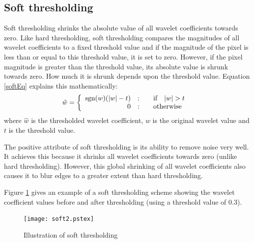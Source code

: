 \documentclass[12pt]{report}
\begin{document}
\subsection{Soft thresholding}
\label{subsec:softTh}
Soft thresholding shrinks the absolute value of all wavelet coefficients towards zero.
Like hard thresholding, soft thresholding compares the magnitudes of all wavelet coefficients
to a fixed threshold value and if the magnitude of the pixel is 
less than or equal to this threshold value, it is set to zero. However, if the 
pixel magnitude is greater than the threshold value, its absolute value is shrunk 
towards zero. How much it is shrunk depends upon the threshold value.
Equation \ref{softEq} explains this mathematically:
\begin{equation}
        \hat{w} =  \left\{ \begin{array}{r@{\quad:\quad}l} \mbox{sgn}(w)(|w|-t) & \quad\mbox{if}\quad |w| > t \\
                        0 & \quad\mbox{otherwise}\quad
                        \end{array} \right.
	\label{softEq}
\end{equation}	
where $\hat{w}$ is the thresholded wavelet coefficient, $w$ is the original wavelet value and
$t$ is the threshold value.

The positive attribute of soft thresholding is its ability to remove noise very well.
It achieves this because it shrinks all wavelet coefficients towards zero (unlike hard thresholding). 
However, this global shrinking of all wavelet coefficients also causes it to blur edges 
to a greater extent than hard thresholding.

Figure \ref{softFig} gives an example of a soft thresholding scheme showing the 
wavelet coefficient values before and after thresholding (using a threshold value of 0.3).

\begin{figure}[htb]
	\begin{center}
		\texttt{[image: soft2.pstex]}
		\caption{Illustration of soft thresholding} 
		\label{softFig}
	\end{center}
\end{figure}
\end{document}

